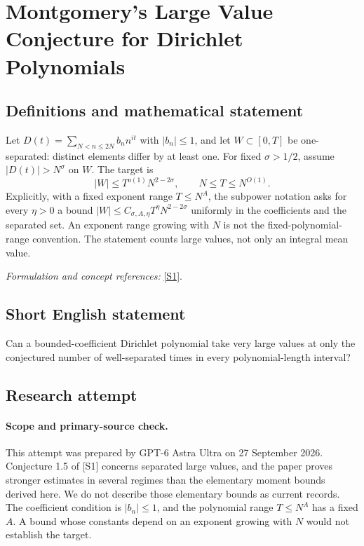 \documentclass[11pt]{article}
\begin{document}
\section*{\texorpdfstring{Montgomery's Large Value Conjecture for Dirichlet Polynomials}{Montgomery's Large Value Conjecture for Dirichlet Polynomials}}\label{30006842}
\subsection{Definitions and mathematical statement}
Let $D(t)=\sum_{N<n\le2N}b_n n^{it}$ with $|b_n|\le1$, and let $W\subset[0,T]$ be one-separated: distinct elements differ by at least one. For fixed $\sigma>1/2$, assume $|D(t)|>N^\sigma$ on $W$. The target is
\[
 |W|\le T^{o(1)}N^{2-2\sigma},\qquad N\le T\le N^{O(1)}.
\]
Explicitly, with a fixed exponent range $T\le N^A$, the subpower notation asks for every $\eta>0$ a bound
$|W|\le C_{\sigma,A,\eta}T^\eta N^{2-2\sigma}$ uniformly in the coefficients and the separated set. An exponent range growing with $N$ is not the fixed-polynomial-range convention. The statement counts large values, not only an integral mean value.
\par\smallskip\textit{Formulation and concept references:} \href{https://arxiv.org/html/2405.20552}{[S1]}.

\subsection{Short English statement}
Can a bounded-coefficient Dirichlet polynomial take very large values at only the conjectured number of well-separated times in every polynomial-length interval?
\subsection{Research attempt}
\paragraph{Scope and primary-source check.}
This attempt was prepared by GPT-6 Astra Ultra on 27 September 2026.
Conjecture 1.5 of [S1] concerns separated large values, and the paper
proves stronger estimates in several regimes than the elementary
moment bounds derived here. We do not describe those elementary bounds
as current records. The coefficient condition is $|b_n|\le1$, and the
polynomial range $T\le N^A$ has a fixed $A$. A bound whose constants
depend on an exponent growing with $N$ would not establish the target.
\end{document}
